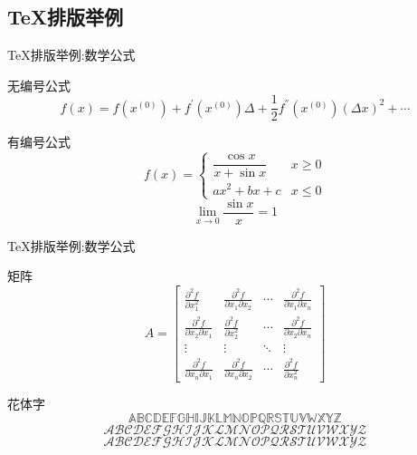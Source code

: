 \documentclass[UTF8,11pt]{beamer}
\begin{document}
\subsection{\TeX 排版举例}\label{eq_example}
\begin{frame}{\TeX 排版举例:数学公式}
	\begin{block}{无编号公式}
		$$ f(x)=f(x^{(0)})+f^{'}(x^{(0)})\Delta +\frac{1}{2}f^{''}(x^{(0)})(\Delta x)^2+\cdots$$
	\end{block}
	
	\begin{block}{有编号公式}
		\begin{equation}\label{eq1}
			f(x) = 
			\begin{cases}
			\dfrac{\cos{x}}{x+\sin{x}} & x \geq 0 \\
							ax^2+bx+c & x \leq 0
			\end{cases}
		\end{equation}
		\begin{equation}\label{eq2}
		 \lim_{x \rightarrow 0} \frac{\sin x}{x}=1
		\end{equation}
	\end{block}
\end{frame}


\begin{frame}{\TeX 排版举例:数学公式}
	\begin{block}{矩阵}
		$$	A=\begin{bmatrix} \frac{\partial^2f }{\partial x_1^2} &\frac{\partial^2 f}{\partial x_1 \partial x_2} & \cdots & \frac{\partial^2f}{\partial x_1\partial x_n}\\ \frac{\partial^2f}{\partial x_2\partial x_1 } & \frac{\partial^2f}{\partial x_2^2}&\cdots &\frac{\partial^2f}{\partial x_2\partial x_n} \\\vdots&\vdots&\ddots & \vdots\\ \frac{\partial^2f}{\partial x_n\partial x_1}&\frac{\partial^2f}{\partial x_n \partial x_2}&\cdots&\frac{\partial^2f }{\partial x_n^2}  \end{bmatrix}$$		
	\end{block}
	\begin{block}{花体字}
		$$\mathbb{ABCDEFGHIJKLMNOPQRSTUVWXYZ}$$
		$$\mathscr{ABCDEFGHIJKLMNOPQRSTUVWXYZ}$$ 
		$$\mathcal{ABCDEFGHIJKLMNOPQRSTUVWXYZ}$$
	\end{block}
\end{frame}
\end{document}
